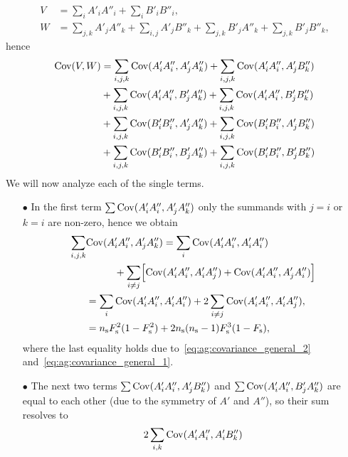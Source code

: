 \begin{itemize}
\begin{align}
      V &= \sum_i A'_i A''_i + \sum_i B'_i B''_i, \\
      W &= \sum_{j,k} A'_j A''_k + \sum_{i,j} A'_j B''_k +
        \sum_{j,k} B'_j A''_k + \sum_{j,k} B'_j B''_k,
        \label{eq:ag:w_representation}
    \end{align}
    hence
    \begin{align}
      {\mathrm{Cov}}(V, W)
        &= \sum_{i,j,k} {\mathrm{Cov}}( A'_i A''_i, A'_j A''_k ) + \sum_{i,j,k} {\mathrm{Cov}}( A'_i A''_i, A'_j B''_k ) \notag \\
        &+ \sum_{i,j,k} {\mathrm{Cov}}( A'_i A''_i, B'_j A''_k ) + \sum_{i,j,k} {\mathrm{Cov}}( A'_i A''_i, B'_j B''_k ) \notag \\
        &+ \sum_{i,j,k} {\mathrm{Cov}}( B'_i B''_i, A'_j A''_k ) + \sum_{i,j,k} {\mathrm{Cov}}( B'_i B''_i, A'_j B''_k ) \notag \\
        &+ \sum_{i,j,k} {\mathrm{Cov}}( B'_i B''_i, B'_j A''_k ) + \sum_{i,j,k} {\mathrm{Cov}}( B'_i B''_i, B'_j B''_k )
    \end{align}
    We will now analyze each of the single terms.
    \begin{itemize}
      \item[$\bullet$]
        In the first term $\sum {\mathrm{Cov}}( A'_i A''_i, A'_j A''_k )$
        only the summands with $j=i$ or $k=i$ are non-zero, hence we
        obtain
        \begin{align}
          \sum_{i,j,k} &{\mathrm{Cov}}( A'_i A''_i, A'_j A''_k )
             = \sum_i {\mathrm{Cov}}( A'_i A''_i, A'_i A''_i) \notag \\
            &\hspace{1cm}+ \sum_{i \ne j} \Bigl[ {\mathrm{Cov}}( A'_i A''_i, A'_i A''_j)
            + {\mathrm{Cov}}( A'_i A''_i, A'_j A''_i)\Bigr] \notag \\
            &= \sum_i {\mathrm{Cov}}( A'_i A''_i, A'_i A''_i)
            + 2 \sum_{i \ne j} {\mathrm{Cov}}( A'_i A''_i, A'_i A''_j), \notag\\
            &= n_\text{s} F_\text{s}^2(1 - F_\text{s}^2)+2n_\text{s}(n_\text{s}-1) F_\text{s}^3 (1 - F_\text{s}),
            \label{eq:ag:comp_covariance_4}
        \end{align}
        where the last equality holds due
        to~\eqref{eq:ag:covariance_general_2}
        and~\eqref{eq:ag:covariance_general_1}.
      \item[$\bullet$]
        The next two terms $\sum {\mathrm{Cov}}( A'_i A''_i, A'_j B''_k )$ and
        $\sum {\mathrm{Cov}}( A'_i A''_i, B'_j A''_k )$ are equal to each other
        (due to the symmetry of $A'$ and $A''$), so their sum resolves
        to
        \begin{equation}
          2 \sum_{i,k} \Cov( A'_i A''_i, A'_i B''_k )

\end{equation}
\end{itemize}
\end{itemize}
